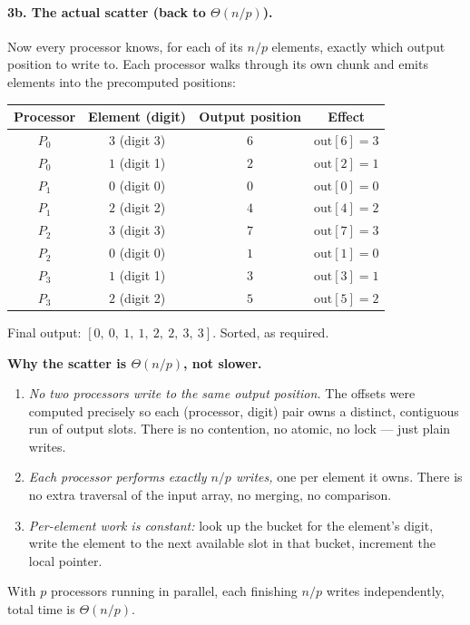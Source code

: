 \paragraph{3b. The actual scatter (back to $\Theta(n/p)$).}
Now every processor knows, for each of its $n/p$ elements, exactly which
output position to write to. Each processor walks through its own chunk
and emits elements into the precomputed positions:
\begin{center}
\begin{tabular}{c|c|c|c}
\toprule
\textbf{Processor} & \textbf{Element (digit)} & \textbf{Output position} & \textbf{Effect} \\
\midrule
$P_0$ & $3$ (digit 3) & $6$ & $\text{out}[6] = 3$ \\
$P_0$ & $1$ (digit 1) & $2$ & $\text{out}[2] = 1$ \\
$P_1$ & $0$ (digit 0) & $0$ & $\text{out}[0] = 0$ \\
$P_1$ & $2$ (digit 2) & $4$ & $\text{out}[4] = 2$ \\
$P_2$ & $3$ (digit 3) & $7$ & $\text{out}[7] = 3$ \\
$P_2$ & $0$ (digit 0) & $1$ & $\text{out}[1] = 0$ \\
$P_3$ & $1$ (digit 1) & $3$ & $\text{out}[3] = 1$ \\
$P_3$ & $2$ (digit 2) & $5$ & $\text{out}[5] = 2$ \\
\bottomrule
\end{tabular}
\end{center}
Final output: $[0,\ 0,\ 1,\ 1,\ 2,\ 2,\ 3,\ 3]$. Sorted, as required.

\begin{ppkey}
\textbf{Why the scatter is $\Theta(n/p)$, not slower.}
\begin{enumerate}[leftmargin=*]
  \item \emph{No two processors write to the same output position.}
        The offsets were computed precisely so each (processor, digit)
        pair owns a distinct, contiguous run of output slots. There is
        no contention, no atomic, no lock --- just plain writes.
  \item \emph{Each processor performs exactly $n/p$ writes,} one per
        element it owns. There is no extra traversal of the input
        array, no merging, no comparison.
  \item \emph{Per-element work is constant:} look up the bucket for the
        element's digit, write the element to the next available slot
        in that bucket, increment the local pointer.
\end{enumerate}
With $p$ processors running in parallel, each finishing $n/p$ writes
independently, total time is $\Theta(n/p)$.
\end{ppkey}

